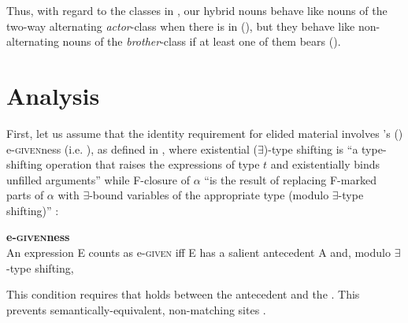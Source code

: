 \documentclass[output=paper,modfonts,newtxmath,hidelinks]{langscibook}
\begin{document}
\noindent Thus, with regard to the  classes in , our hybrid nouns behave like nouns of the two-way alternating \textit{actor}-class when there is  in  (), but they behave like non-alternating nouns of the \textit{brother}-class if at least one of them bears  ().
		
		
\section{Analysis}	
		
		First, let us assume that the identity requirement for elided material involves \citeauthor{merchant2001}'s (\citeyear{merchant2001}) e-\textsc{given}ness (i.e. ), as defined in , where existential ($\exists$)-type shifting is ``a type-shifting operation that raises the expressions of type $t$ and existentially binds unfilled arguments'' while F-closure of $\alpha$ ``is the result of replacing F-marked parts of $\alpha$ with $\exists$-bound variables of the appropriate type (modulo $\exists$-type shifting)'' \citep[14]{merchant2001}: 
		
		\ea \label{14:egive} \textbf{e-\textsc{given}ness} \citep[26]{merchant2001}\\
		An expression E counts as e-\textsc{given} iff E has a salient antecedent A and, modulo $\exists$-type shifting,
        \begin{xlist}
        \end{xlist}
        \z

     
      
\newpage       
\noindent This condition requires that  holds between the antecedent and the . This prevents semantically-equivalent, non-matching  sites  \citet[27]{merchant2001}.
		
		\ea
		\label{14:ex20a}
		\label{14:ex20b}
        \z \z
        
\end{document}
